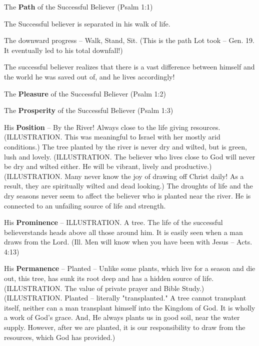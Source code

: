 \begin{compactenum}[I.][8]
	\item The \textbf{Path} of the Successful Believer (Psalm 1:1)
	\begin{compactenum}[A.]
		\item The Successful believer is separated in his walk of life.
		\item The downward progress – Walk, Stand, Sit. (This is the path Lot took – Gen. 19. It eventually led to his total downfall!)
		\item The successful believer realizes that there is a vast difference between himself and the world he was saved out of, and he lives accordingly!
	\end{compactenum}
	\item The \textbf{Pleasure} of the Successful Believer (Psalm 1:2)
	\item The \textbf{Prosperity} of the Successful Believer (Psalm 1:3)
	\begin{compactenum}[A.]
		\item His \textbf{Position} – By the River! Always close to the life giving resources. (ILLUSTRATION. This was meaningful to Israel with her mostly arid conditions.) The tree planted by the river is never dry and wilted, but is green, lush and lovely. (ILLUSTRATION. The believer who lives close to God will never be dry and wilted either. He will be vibrant, lively and productive.) (ILLUSTRATION. Many never know the joy of drawing off Christ daily! As a result, they are spiritually wilted and dead looking.) The droughts of life and the dry seasons never seem to affect the believer who is planted near the river. He is connected to an unfailing source of life and strength.
		\item His \textbf{Prominence} – ILLUSTRATION. A tree. The life of the successful believerstands heads above all those around him. It is easily seen when a man draws from the Lord. (Ill. Men will know when you have been with Jesus – Acts. 4:13)
		\item His \textbf{Permanence} – Planted – Unlike some plants, which live for a season and die out, this tree, has sunk its root deep and has a hidden source of life. (ILLUSTRATION. The value of private prayer and Bible Study.) (ILLUSTRATION. Planted – literally "transplanted." A tree cannot transplant itself, neither can a man transplant himself into the Kingdom of God. It is wholly a work of God’s grace. And, He always plants us in good soil, near the water supply. However, after we are planted, it is our responsibility to draw from the resources, which God has provided.)

\end{compactenum}
\end{compactenum}
